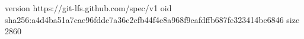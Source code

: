 version https://git-lfs.github.com/spec/v1
oid sha256:a4d4ba51a7cae96fddc7a36c2cfb44f4e8a968f9cafdffb687fe323414be6846
size 2860
